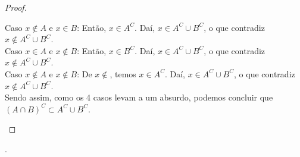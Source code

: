 \begin{proof}
\begin{enumerate}[i)]
\begin{enumerate}[a)]
                Caso $x \not\in A$ e $x \in B$: Então, $x \in A^C$. Daí, $x \in A^C \cup B^C$, o que contradiz $x \not\in A^C \cup B^C$.\\
                Caso $x \in A$ e $x \not\in B$: Então, $x \in B^C$. Daí, $x \in A^C \cup B^C$, o que contradiz $x \not\in A^C \cup B^C$.\\
                Caso $x \not\in A$ e $x \not\in B$: De $x \not\in $, temos $x \in A^C$. Daí, $x \in A^C \cup B^C$, o que contradiz $x \not\in A^C \cup B^C$.\\
                Sendo assim, como os 4 casos levam a um absurdo, podemos concluir que $(A \cap B)^C \subset A^C \cup B^C$.
        \end{enumerate}
\end{enumerate}
\end{proof}

\begin{onlineact}
.
\end{onlineact}

